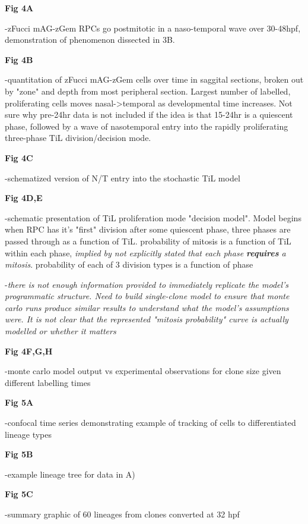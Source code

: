 \bigskip

\textbf{Fig 4A}

-zFucci mAG-zGem RPCs go postmitotic in a naso-temporal wave over 30-48hpf, demonstration of phenomenon dissected in 3B.

\textbf{Fig 4B}

-quantitation of zFucci mAG-zGem cells over time in saggital sections, broken out by "zone" and depth from most peripheral section. Largest number of labelled, proliferating cells moves nasal->temporal as developmental time increases. Not sure why pre-24hr data is not included if the idea is that 15-24hr is a quiescent phase, followed by a wave of nasotemporal entry into the rapidly proliferating three-phase TiL division/decision mode.

\textbf{Fig 4C}

-schematized version of N/T entry into the stochastic TiL model

\textbf{Fig 4D,E}

-schematic presentation of TiL proliferation mode "decision model". Model begins when RPC has it's "first" division after some quiescent phase, three phases are passed through as a function of TiL. probability of mitosis is a function of TiL within each phase, \textit{implied by not explicitly stated that each phase \textbf{requires} a mitosis}. probability of each of 3 division types is a function of phase

-\textit{there is not enough information provided to immediately replicate the model's programmatic structure. Need to build single-clone model to ensure that monte carlo runs produce similar results to understand what the model's assumptions were. It is not clear that the represented "mitosis probability" curve is actually modelled or whether it matters}

\textbf{Fig 4F,G,H}

-monte carlo model output vs experimental observations for clone size given different labelling times

\bigskip

\textbf{Fig 5A}

-confocal time series demonstrating example of tracking of cells to differentiated lineage types

\textbf{Fig 5B}

-example lineage tree for data in A)

\textbf{Fig 5C}

-summary graphic of 60 lineages from clones converted at 32 hpf

